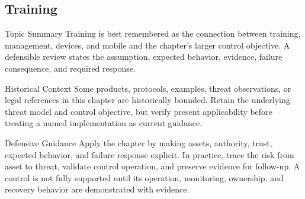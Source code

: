 \documentclass[11pt,letterpaper]{article}
\begin{document}
\subsection*{Training}
\begin{CornellNotesTable}
\end{CornellNotesTable}
\begin{CornellSummaryBox}{Topic Summary}
Training is best remembered as the connection between training, management, devices, and mobile and the chapter's larger control objective. A defensible review states the assumption, expected behavior, evidence, failure consequence, and required response.
\end{CornellSummaryBox}
\begin{CornellWarningBox}{Historical Context}
Some products, protocols, examples, threat observations, or legal references in this chapter are historically bounded. Retain the underlying threat model and control objective, but verify present applicability before treating a named implementation as current guidance.
\end{CornellWarningBox}
\begin{CornellOverviewBox}{Defensive Guidance}
Apply the chapter by making assets, authority, trust, expected behavior, and failure response explicit. In practice, trace the risk from asset to threat, validate control operation, and preserve evidence for follow-up. A control is not fully supported until its operation, monitoring, ownership, and recovery behavior are demonstrated with evidence.
\end{CornellOverviewBox}
\end{document}
